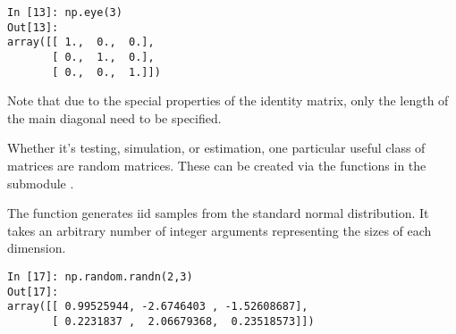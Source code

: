 \begin{verbatim}
In [13]: np.eye(3)
Out[13]:
array([[ 1.,  0.,  0.],
       [ 0.,  1.,  0.],
       [ 0.,  0.,  1.]])
\end{verbatim}

Note that due to the special properties of the identity matrix, only the length of the main diagonal need to be specified.

Whether it's testing, simulation, or estimation, one particular useful class of matrices are random matrices. These can be created via the functions in the submodule .

The  function generates iid samples from the standard normal distribution. It takes an arbitrary number of integer arguments representing the sizes of each dimension.

\begin{verbatim}
In [17]: np.random.randn(2,3)
Out[17]:
array([[ 0.99525944, -2.6746403 , -1.52608687],
       [ 0.2231837 ,  2.06679368,  0.23518573]])
\end{verbatim}

